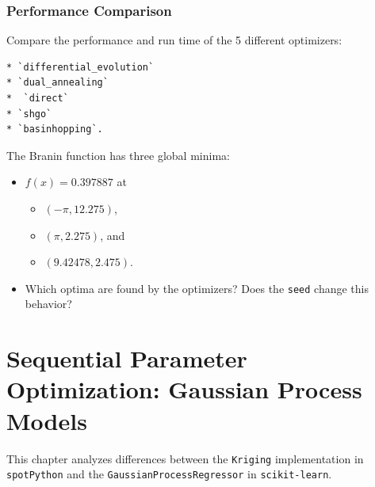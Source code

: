 \documentclass[
  letterpaper,
  DIV=11,
  numbers=noendperiod]{scrreprt}
\providecommand{\tightlist}{%
  \setlength{\itemsep}{0pt}\setlength{\parskip}{0pt}}\usepackage{longtable,booktabs,array}
\begin{document}
\hypertarget{performance-comparison}{%
\subsection{Performance Comparison}\label{performance-comparison}}

Compare the performance and run time of the 5 different optimizers:

\begin{verbatim}
* `differential_evolution`
* `dual_annealing`
*  `direct`
* `shgo`
* `basinhopping`.
\end{verbatim}

The Branin function has three global minima:

\begin{itemize}
\tightlist
\item
  \(f(x) = 0.397887\) at

  \begin{itemize}
  \tightlist
  \item
    \((-\pi, 12.275)\),
  \item
    \((\pi, 2.275)\), and
  \item
    \((9.42478, 2.475)\).\\
  \end{itemize}
\item
  Which optima are found by the optimizers? Does the \texttt{seed}
  change this behavior?
\end{itemize}

\hypertarget{sec-gaussian-process-models}{%
\chapter{Sequential Parameter Optimization: Gaussian Process
Models}\label{sec-gaussian-process-models}}

This chapter analyzes differences between the \texttt{Kriging}
implementation in \texttt{spotPython} and the
\texttt{GaussianProcessRegressor} in \texttt{scikit-learn}.
\end{document}
